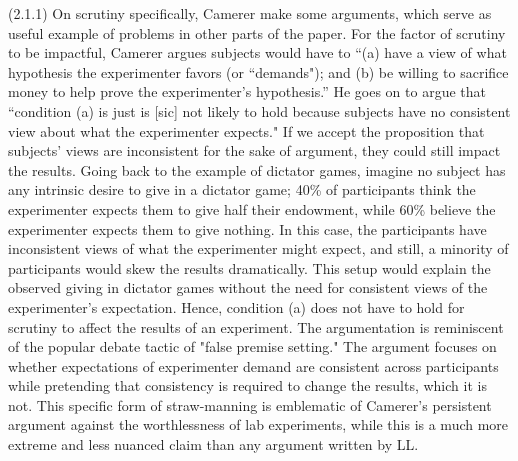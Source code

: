 \documentclass{article}
\begin{document}
(2.1.1) 	On scrutiny specifically, Camerer make some arguments, which serve as useful example of problems in other parts of the paper. 
For the factor of scrutiny to be impactful, Camerer argues subjects would have to “(a) have a view of what hypothesis the experimenter favors (or “demands"); and (b) be willing to sacrifice money to help prove the experimenter's hypothesis.” He goes on to argue that “condition (a) is just is [sic] not likely to hold because subjects have no consistent view about what the experimenter expects." If we accept the proposition that subjects’ views are inconsistent for the sake of argument, they could still impact the results. Going back to the example of dictator games, imagine no subject has any intrinsic desire to give in a dictator game; 40\% of participants think the experimenter expects them to give half their endowment, while 60\% believe the experimenter expects them to give nothing. In this case, the participants have inconsistent views of what the experimenter might expect, and still, a minority of participants would skew the results dramatically. This setup would explain the observed giving in dictator games without the need for consistent views of the experimenter's expectation. Hence, condition (a) does not have to hold for scrutiny to affect the results of an experiment. The argumentation is reminiscent of the popular debate tactic of "false premise setting." The argument focuses on whether expectations of experimenter demand are consistent across participants while pretending that consistency is required to change the results, which it is not. This specific form of straw-manning is emblematic of Camerer's persistent argument against the worthlessness of lab experiments, while this is a much more extreme and less nuanced claim than any argument written by LL. 
\\
\\
\end{document}
